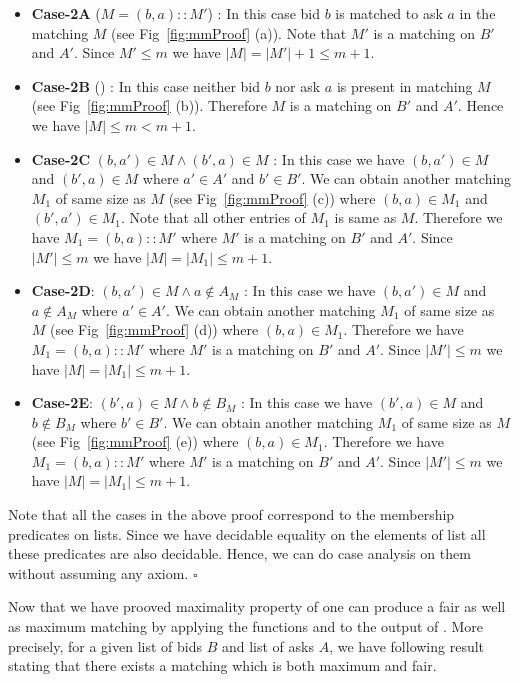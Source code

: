\documentclass[a4paper,UKenglish,cleveref, autoref]{lipics-v2019}
\begin{document}
\begin{itemize}
\begin{itemize}
\item \textbf{Case-2A} ($M = (b,a)::M'$) : In this case  bid $b$ is matched to ask $a$ in the matching $M$ (see Fig~\ref{fig:mmProof} (a)). Note that $M'$ is a matching on $B'$ and $A'$. Since $M' \leq m$ we have $|M|= |M'|+1 \leq m+1$.
\item \textbf{Case-2B} () : In this case neither bid $b$ nor ask $a$ is present in matching $M$ (see Fig~\ref{fig:mmProof} (b)). Therefore $M$ is a matching on $B'$ and $A'$. Hence we have $|M| \leq m < m+1$.
\item \textbf{Case-2C} $(b,a') \in M \land (b',a) \in M$ : In this case we have $(b,a') \in M$ and  $(b',a) \in M$ where $a' \in A'$ and $b' \in B'$. We can obtain another matching $M_1$ of same size as $M$ (see Fig~\ref{fig:mmProof} (c)) where $(b,a) \in M_1$ and $(b',a') \in M_1$. Note that all other entries of $M_1$ is same as $M$. Therefore we have $M_1 = (b,a)::M'$ where $M'$ is a matching on $B'$ and $A'$. Since $|M'| \leq m$ we have $|M|=|M_1| \leq m+1$.
\item \textbf{Case-2D}: $(b,a')\in M \land a \notin A_M$ : In this case we have $(b,a')\in M$ and $a \notin A_M$ where $a'\in A'$. We can obtain another matching $M_1$ of same size as $M$ (see Fig~\ref{fig:mmProof} (d)) where $(b,a) \in M_1$. 
Therefore we have $M_1 = (b,a)::M'$ where $M'$ is a matching on $B'$ and $A'$.
Since $|M'| \leq m$ we have $|M|=|M_1| \leq m+1$.
\item \textbf{Case-2E}: $(b',a)\in M \land b \notin B_M$ : In this case we have $(b',a)\in M$ and $b \notin B_M$ where $b'\in B'$. We can obtain another matching $M_1$ of same size as $M$ (see Fig~\ref{fig:mmProof} (e)) where $(b,a) \in M_1$. 
Therefore we have $M_1 = (b,a)::M'$ where $M'$ is a matching on $B'$ and $A'$.
Since $|M'| \leq m$ we have $|M|=|M_1| \leq m+1$.
\end{itemize}
\end{itemize}
Note that all the cases in the above proof correspond to the membership predicates on lists. Since we have  decidable equality on the elements of list all these predicates are also decidable. Hence, we can do case analysis on them without assuming any axiom. $\square$

Now that we have prooved maximality property of   one can produce a fair as well as maximum matching by applying the functions   and  to the output of . More precisely, for a given list of bids $B$ and list of asks $A$, we have  following result stating that there exists a matching which is both maximum and fair. 
\end{document}
